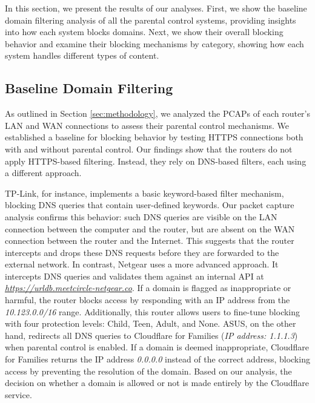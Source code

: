 In this section, we present the results of our analyses. First, we show the baseline domain filtering analysis of all the parental control systems, providing insights into how each system blocks domains. Next, we show their overall blocking behavior and examine their blocking mechanisms by category, showing how each system handles different types of content.
 
\subsection{Baseline Domain Filtering} \label{sec:results-baseline}
As outlined in Section \ref{sec:methodology}, we analyzed the PCAPs of each router’s LAN and WAN connections to assess their parental control mechanisms. We established a baseline for blocking behavior by testing HTTPS connections both with and without parental control. Our findings show that the routers do not apply HTTPS-based filtering. Instead, they rely on DNS-based filters, each using a different approach.

TP-Link, for instance, implements a basic keyword-based filter mechanism, blocking DNS queries that contain user-defined keywords. Our packet capture analysis confirms this behavior: such DNS queries are visible on the LAN connection between the computer and the router, but are absent on the WAN connection between the router and the Internet. This suggests that the router intercepts and drops these DNS requests before they are forwarded to the external network.
In contrast, Netgear uses a more advanced approach.
It intercepts DNS queries and validates them against an internal API at \emph{\url{https://urldb.meetcircle-netgear.co}}.
If a domain is flagged as inappropriate or harmful, the router blocks access by responding with an IP address from the \emph{10.123.0.0/16} range.
Additionally, this router allows users to fine-tune blocking with four protection levels: Child, Teen, Adult, and None.
ASUS, on the other hand, redirects all DNS queries to Cloudflare for Families (\emph{IP address: 1.1.1.3}) when parental control is enabled. 
If a domain is deemed inappropriate, Cloudflare for Families returns the IP address \emph{0.0.0.0} instead of the correct address, blocking access by preventing the resolution of the domain.
Based on our analysis, the decision on whether a domain is allowed or not is made entirely by the Cloudflare service.

